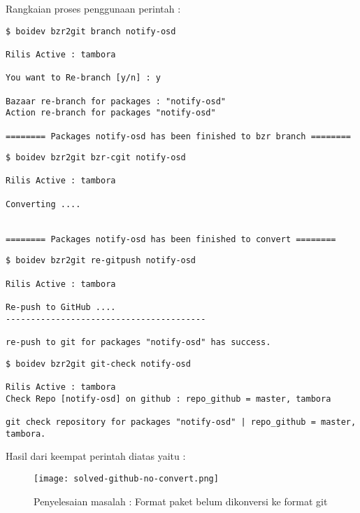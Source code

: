\noindent
Rangkaian proses penggunaan perintah :

\begin{lstlisting}[language=ShellBash3]
$ boidev bzr2git branch notify-osd

Rilis Active : tambora

You want to Re-branch [y/n] : y

Bazaar re-branch for packages : "notify-osd"
Action re-branch for packages "notify-osd" 

======== Packages notify-osd has been finished to bzr branch ========

\end{lstlisting}

\begin{lstlisting}[language=ShellBash3]
$ boidev bzr2git bzr-cgit notify-osd

Rilis Active : tambora

Converting .... 


======== Packages notify-osd has been finished to convert ========

\end{lstlisting}

\begin{lstlisting}[language=ShellBash3]
$ boidev bzr2git re-gitpush notify-osd

Rilis Active : tambora

Re-push to GitHub .... 
----------------------------------------

re-push to git for packages "notify-osd" has success. 
\end{lstlisting}

\begin{lstlisting}[language=ShellBash3]
$ boidev bzr2git git-check notify-osd

Rilis Active : tambora
Check Repo [notify-osd] on github : repo_github = master, tambora 

git check repository for packages "notify-osd" | repo_github = master, tambora. 
\end{lstlisting}

\noindent
Hasil dari keempat perintah diatas yaitu :

\begin{figure}[H]
	\centering
	\texttt{[image: solved-github-no-convert.png]}
	\caption{Penyelesaian masalah : Format paket belum dikonversi ke format git}
	\label{fig:bab3_solved1-gihub-no-convert}
\end{figure}


